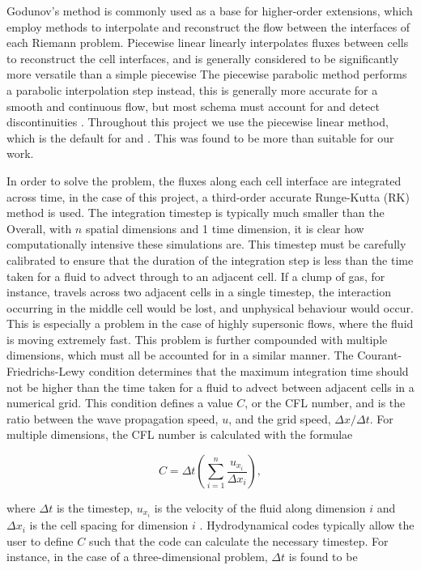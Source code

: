 Godunov's method is commonly used as a base for higher-order extensions, which employ methods to interpolate and reconstruct the flow between the interfaces of each Riemann problem.
Piecewise linear linearly interpolates fluxes between cells to reconstruct the cell interfaces, and is generally considered to be significantly more versatile than a simple piecewise \parencite{vanleerUltimateConservativeDifference1979}
The piecewise parabolic method performs a parabolic interpolation step instead, this is generally more accurate for a smooth and continuous flow, but most schema must account for and detect discontinuities
\parencite{colella_piecewise_1984}.
Throughout this project we use the piecewise linear method, which is the default for \athena{} and \mg{}.
This was found to be more than suitable for our work.

In order to solve the problem, the fluxes along each cell interface are integrated across time, in the case of this project, a third-order accurate Runge-Kutta (RK) method is used.
The integration timestep is typically much smaller than the 
Overall, with $n$ spatial dimensions and 1 time dimension, it is clear how computationally intensive these simulations are.
This timestep must be carefully calibrated to ensure that the duration of the integration step is less than the time taken for a fluid to advect through to an adjacent cell.
If a clump of gas, for instance, travels across two adjacent cells in a single timestep, the interaction occurring in the middle cell would be lost, and unphysical behaviour would occur.
This is especially a problem in the case of highly supersonic flows, where the fluid is moving extremely fast.
This problem is further compounded with multiple dimensions, which must all be accounted for in a similar manner.
The Courant-Friedrichs-Lewy condition determines that the maximum integration time should not be higher than the time taken for a fluid to advect between adjacent cells in a numerical grid.
This condition defines a value $C$, or the CFL number, and is the ratio between the wave propagation speed, $u$, and the grid speed, $\Delta x / \Delta t$.
For multiple dimensions, the CFL number is calculated with the formulae

\begin{equation}
  C = \Delta t \left(\sum^n_{i=1} \frac{u_{x_i}}{\Delta x_i}\right) ,
\end{equation}

\noindent
where $\Delta t$ is the timestep, $u_{x_i}$ is the velocity of the fluid along dimension $i$ and $\Delta x_i$ is the cell spacing for dimension $i$ \parencite[Ch.~5]{toro_riemann_2013}.
Hydrodynamical codes typically allow the user to define $C$ such that the code can calculate the necessary timestep.
For instance, in the case of a three-dimensional problem, $\Delta t$ is found to be

